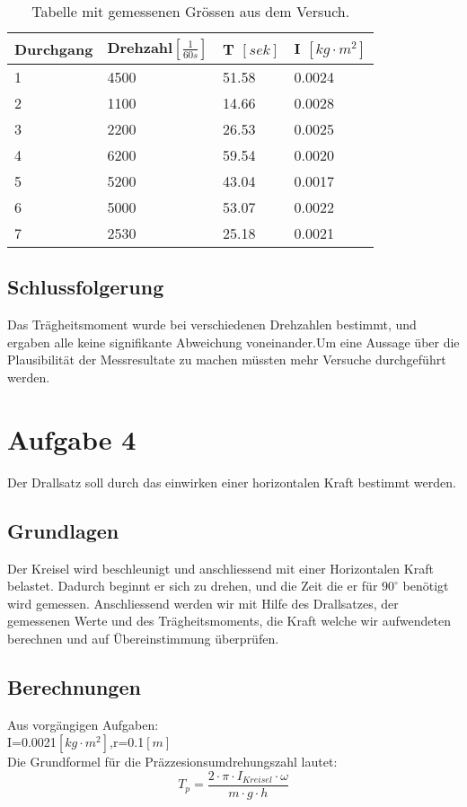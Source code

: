 \documentclass{article}
\begin{document}
\begin{table}[H]
   \center
    \begin{tabular}{|l|l|l|l|}
        \hline
        Durchgang & Drehzahl$[\frac{1}{60s}]$ & T $[sek]$    & I  $[kg\cdot m^2]$    \\ \hline
        1         & 4500     & 51.58 & 0.0024 \\ 
        2         & 1100     & 14.66 & 0.0028 \\ 
        3         & 2200     & 26.53 & 0.0025 \\ 
        4         & 6200     & 59.54 & 0.0020 \\ 
        5         & 5200     & 43.04 & 0.0017 \\ 
        6         & 5000     & 53.07 & 0.0022 \\ 
        7         & 2530     & 25.18 & 0.0021 \\
        \hline
    \end{tabular}
    \caption{Tabelle mit gemessenen Grössen aus dem Versuch.}
\end{table}
\subsection{Schlussfolgerung}
Das Trägheitsmoment wurde bei verschiedenen Drehzahlen bestimmt, und ergaben alle keine signifikante Abweichung voneinander.Um eine Aussage über die Plausibilität der Messresultate zu machen müssten mehr Versuche durchgeführt werden.
\section{Aufgabe 4}
Der Drallsatz soll durch das einwirken einer horizontalen Kraft bestimmt werden.
\subsection{Grundlagen}
Der Kreisel wird beschleunigt und anschliessend mit einer Horizontalen Kraft belastet. Dadurch beginnt er sich zu drehen, und die Zeit die er für $90^\circ$ benötigt wird gemessen. Anschliessend werden wir mit Hilfe des Drallsatzes, der gemessenen Werte und des Trägheitsmoments, die Kraft welche wir aufwendeten berechnen und auf Übereinstimmung überprüfen.

\subsection{Berechnungen}
Aus vorgängigen Aufgaben:\\
I=0.0021$[kg\cdot m^2]$,r=0.1$[m]$\vspace{0.2cm}\\ 
Die Grundformel für die Präzzesionsumdrehungszahl lautet:
\begin{equation}
T_p = \frac{2\cdot\pi\cdot I_{Kreisel}\cdot \omega}{m\cdot g\cdot h}
\end{equation}
\end{document}
